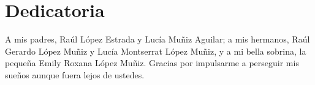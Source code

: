 \chapter*{Dedicatoria}

A mis padres, Raúl López Estrada y Lucía Muñiz Aguilar;
a mis hermanos, Raúl Gerardo López Muñiz y Lucía 
Montserrat López Muñiz, y a mi bella sobrina, 
la pequeña Emily Roxana López Muñiz. 
Gracias por impulsarme a perseguir mis sueños 
aunque fuera lejos de ustedes. 






